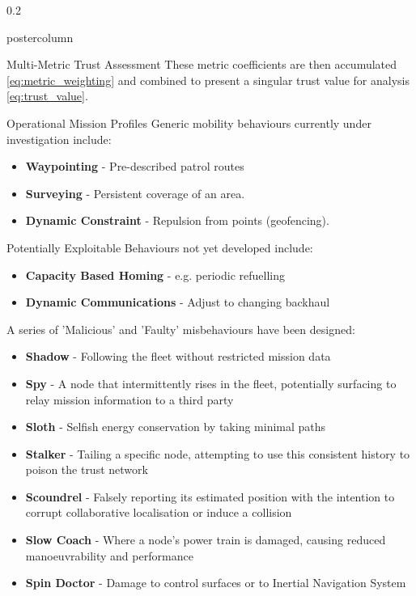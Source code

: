 \documentclass[final,hyperref={pdfpagelabels=false}]{beamer}
\def\colwidth{0.2\linewidth}
\begin{document}
\begin{frame}[fragile]
\begin{columns}[T]
\begin{column}{\colwidth}
\begin{beamercolorbox}[center,wd=\textwidth]{postercolumn}
\begin{minipage}[T]{.98\textwidth}
{\begin{block}{Multi-Metric Trust Assessment}
							These metric coefficients are then accumulated \eqref{eq:metric_weighting} and combined to present a singular trust value for analysis \eqref{eq:trust_value}.
							
							
						\end{block}
						\begin{block}{Operational Mission Profiles}
							Generic mobility behaviours currently under investigation include:
							\begin{itemize}
								\item \textbf{Waypointing} - Pre-described patrol routes
								\item \textbf{Surveying} - Persistent coverage of an area.
								\item \textbf{Dynamic Constraint} - Repulsion from points (geofencing).
							\end{itemize}
														
							Potentially Exploitable Behaviours not yet developed include:
							\begin{itemize}
								\item \textbf{Capacity Based Homing} - e.g. periodic refuelling
								\item \textbf{Dynamic Communications} - Adjust to changing backhaul
							\end{itemize}
							
							A series of 'Malicious' and 'Faulty' misbehaviours have been designed:
							\begin{itemize}
								\item \textbf{Shadow} - Following the fleet without restricted mission data
								\item \textbf{Spy} - A node that intermittently rises in the fleet, potentially surfacing to relay mission information to a third party
								\item \textbf{Sloth} - Selfish energy conservation by taking minimal paths
								\item \textbf{Stalker} - Tailing a specific node, attempting to use this consistent history to poison the trust network
								\item \textbf{Scoundrel} - Falsely reporting its estimated position with the intention to corrupt collaborative localisation or induce a collision
								\item \textbf{Slow Coach} - Where a node's power train is damaged, causing reduced manoeuvrability and performance
								\item \textbf{Spin Doctor} - Damage to control surfaces or to Inertial Navigation System
							\end{itemize}
							

\end{block}}
\end{minipage}
\end{beamercolorbox}
\end{column}
\end{columns}
\end{frame}
\end{document}
